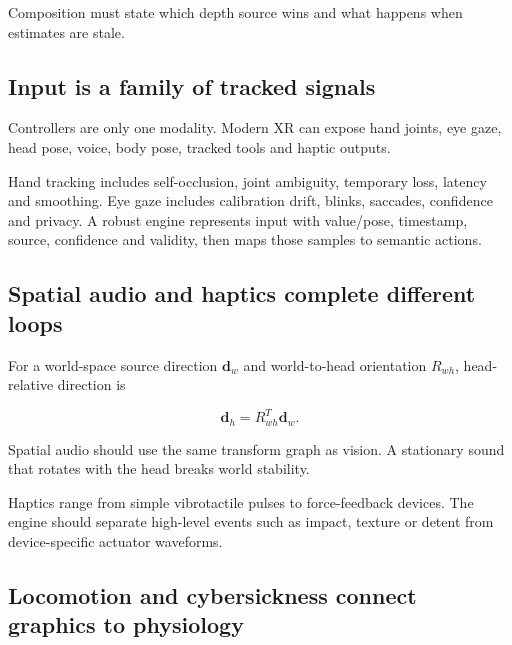 Composition must state which depth source wins and what happens when estimates are stale.

\subsection{Input is a family of tracked signals}\label{04-visual-computing-ii-ch035-input-is-a-family-of-tracked-signals}

\hypertarget{04-visual-computing-ii-ch035-input-is-a-family-of-tracked-signals}{}

Controllers are only one modality. Modern XR can expose hand joints, eye gaze, head pose, voice, body pose, tracked tools and haptic outputs.

Hand tracking includes self-occlusion, joint ambiguity, temporary loss, latency and smoothing. Eye gaze includes calibration drift, blinks, saccades, confidence and privacy. A robust engine represents input with value/pose, timestamp, source, confidence and validity, then maps those samples to semantic actions.

\subsection{Spatial audio and haptics complete different loops}\label{04-visual-computing-ii-ch035-spatial-audio-and-haptics-complete-different-loops}

\hypertarget{04-visual-computing-ii-ch035-spatial-audio-and-haptics-complete-different-loops}{}

For a world-space source direction \(\mathbf d_w\) and world-to-head orientation \(R_{wh}\), head-relative direction is

\[
\mathbf d_h=R_{wh}^{T}\mathbf d_w.
\]

Spatial audio should use the same transform graph as vision. A stationary sound that rotates with the head breaks world stability.

Haptics range from simple vibrotactile pulses to force-feedback devices. The engine should separate high-level events such as impact, texture or detent from device-specific actuator waveforms.

\subsection{Locomotion and cybersickness connect graphics to physiology}\label{04-visual-computing-ii-ch035-locomotion-and-cybersickness-connect-graphics-to-physiology}


